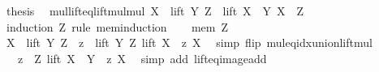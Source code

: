 \begin{isabellebody}
\ {\isacharquery}{\kern0pt}thesis\ \isacommand{{\isachardot}{\kern0pt}}\isamarkupfalse%
\isanewline
{}\isamarkupfalse%
%
\endisatagproof
{\isafoldproof}%
%
\isadelimproof
\isanewline
%
\endisadelimproof
\isanewline
{}\isamarkupfalse%
\ mul{\isacharunderscore}{\kern0pt}lift{\isacharunderscore}{\kern0pt}eq{\isacharunderscore}{\kern0pt}lift{\isacharunderscore}{\kern0pt}mul{\isacharunderscore}{\kern0pt}mul{\isacharcolon}{\kern0pt}\ {\isachardoublequoteopen}X\ {\isacharasterisk}{\kern0pt}\ {\isacharparenleft}{\kern0pt}lift\ Y\ Z{\isacharparenright}{\kern0pt}\ {\isacharequal}{\kern0pt}\ lift\ {\isacharparenleft}{\kern0pt}X\ {\isacharasterisk}{\kern0pt}\ Y{\isacharparenright}{\kern0pt}\ {\isacharparenleft}{\kern0pt}X\ {\isacharasterisk}{\kern0pt}\ Z{\isacharparenright}{\kern0pt}{\isachardoublequoteclose}\isanewline
%
\isadelimproof
%
\endisadelimproof
%
\isatagproof
{}\isamarkupfalse%
\ {\isacharparenleft}{\kern0pt}induction\ Z\ rule{\isacharcolon}{\kern0pt}\ mem{\isacharunderscore}{\kern0pt}induction{\isacharparenright}{\kern0pt}\isanewline
\ \ \isamarkupfalse%
\ {\isacharparenleft}{\kern0pt}mem\ Z{\isacharparenright}{\kern0pt}\isanewline
\ \ \isamarkupfalse%
\ {\isachardoublequoteopen}X\ {\isacharasterisk}{\kern0pt}\ {\isacharparenleft}{\kern0pt}lift\ Y\ Z{\isacharparenright}{\kern0pt}\ {\isacharequal}{\kern0pt}\ {\isacharparenleft}{\kern0pt}{\isasymUnion}z\ {\isasymin}\ lift\ Y\ Z{\isachardot}{\kern0pt}\ lift\ {\isacharparenleft}{\kern0pt}X\ {\isacharasterisk}{\kern0pt}\ z{\isacharparenright}{\kern0pt}\ X{\isacharparenright}{\kern0pt}{\isachardoublequoteclose}\ \isamarkupfalse%
\ {\isacharparenleft}{\kern0pt}simp\ flip{\isacharcolon}{\kern0pt}\ mul{\isacharunderscore}{\kern0pt}eq{\isacharunderscore}{\kern0pt}idx{\isacharunderscore}{\kern0pt}union{\isacharunderscore}{\kern0pt}lift{\isacharunderscore}{\kern0pt}mul{\isacharparenright}{\kern0pt}\isanewline
\ \ \isamarkupfalse%
\ \isamarkupfalse%
\ {\isachardoublequoteopen}{\isachardot}{\kern0pt}{\isachardot}{\kern0pt}{\isachardot}{\kern0pt}\ {\isacharequal}{\kern0pt}\ {\isacharparenleft}{\kern0pt}{\isasymUnion}z\ {\isasymin}\ Z{\isachardot}{\kern0pt}\ lift\ {\isacharparenleft}{\kern0pt}X\ {\isacharasterisk}{\kern0pt}\ {\isacharparenleft}{\kern0pt}Y\ {\isacharplus}{\kern0pt}\ z{\isacharparenright}{\kern0pt}{\isacharparenright}{\kern0pt}\ X{\isacharparenright}{\kern0pt}{\isachardoublequoteclose}\ \isamarkupfalse%
\ {\isacharparenleft}{\kern0pt}simp\ add{\isacharcolon}{\kern0pt}\ lift{\isacharunderscore}{\kern0pt}eq{\isacharunderscore}{\kern0pt}image{\isacharunderscore}{\kern0pt}add{\isacharparenright}{\kern0pt}\isanewline

\end{isabellebody}
